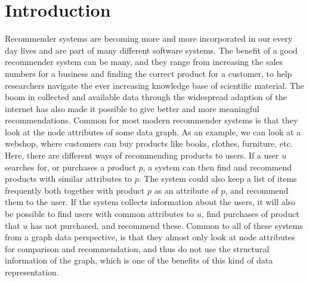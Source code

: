 \section{Introduction}
  Recommender systems are becoming more and more incorporated in our every day lives and are part of many different software systems. The benefit of a good recommender system can be many, and they range from increasing the sales numbers for a business and finding the correct product for a customer, to help researchers navigate the ever increasing knowledge base of scientific material. The boom in collected and available data through the widespread adaption of the internet has also made it possible to give better and more meaningful recommendations. Common for most modern recommender systems is that they look at the node attributes of some data graph. As an example, we can look at a webshop, where customers can buy products like books, clothes, furniture, etc. Here, there are different ways of recommending products to users. If a user $u$ searches for, or purchases a product $p$, a system can then find and recommend products with similar attributes to $p$. The system could also keep a list of items frequently both together with product $p$ as an attribute of $p$, and recommend them to the user. If the system collects information about the users, it will also be possible to find users with common attributes to $u$, find purchases of product that $u$ has not purchased, and recommend these. Common to all of these systems from a graph data perspective, is that they almost only look at node attributes for comparison and recommendation, and thus do not use the structural information of the graph, which is one of the benefits of this kind of data representation.

